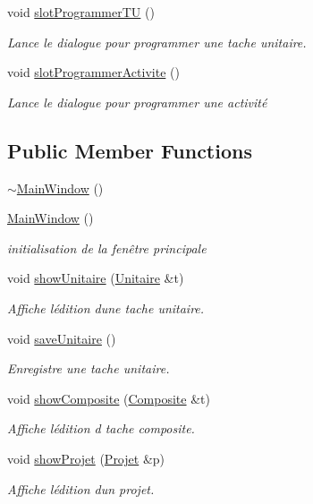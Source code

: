 \begin{DoxyCompactItemize}
void \hyperlink{class_main_window_a22bdfd5758d79d8a0dd6b55817f053a0}{slot\+Programmer\+T\+U} ()
\begin{DoxyCompactList}\small\item\em Lance le dialogue pour programmer une tache unitaire. \end{DoxyCompactList}\item 
void \hyperlink{class_main_window_ac54011d65e21b9a451a255c8ab2856d0}{slot\+Programmer\+Activite} ()
\begin{DoxyCompactList}\small\item\em Lance le dialogue pour programmer une activité \end{DoxyCompactList}\end{DoxyCompactItemize}
\subsection*{Public Member Functions}
\begin{DoxyCompactItemize}
\item 
\hyperlink{class_main_window_ae98d00a93bc118200eeef9f9bba1dba7}{$\sim$\+Main\+Window} ()
\item 
\hyperlink{class_main_window_a34c4b4207b46d11a4100c9b19f0e81bb}{Main\+Window} ()
\begin{DoxyCompactList}\small\item\em initialisation de la fenêtre principale \end{DoxyCompactList}\item 
void \hyperlink{class_main_window_a7bbdf27e0ee846803813e53a39a3bf01}{show\+Unitaire} (\hyperlink{class_unitaire}{Unitaire} \&t)
\begin{DoxyCompactList}\small\item\em Affiche l\textquotesingle{}édition d\textquotesingle{}une tache unitaire. \end{DoxyCompactList}\item 
void \hyperlink{class_main_window_a4d74b656f89425afefef0505508befe7}{save\+Unitaire} ()
\begin{DoxyCompactList}\small\item\em Enregistre une tache unitaire. \end{DoxyCompactList}\item 
void \hyperlink{class_main_window_aad741802f157d624081f9588a120f016}{show\+Composite} (\hyperlink{class_composite}{Composite} \&t)
\begin{DoxyCompactList}\small\item\em Affiche l\textquotesingle{}édition d\textquotesingle{} tache composite. \end{DoxyCompactList}\item 
void \hyperlink{class_main_window_a1dfed2a765d3fa7bfb340dd37a5350f1}{show\+Projet} (\hyperlink{class_projet}{Projet} \&p)
\begin{DoxyCompactList}\small\item\em Affiche l\textquotesingle{}édition d\textquotesingle{}un projet. \end{DoxyCompactList}\end{DoxyCompactItemize}


